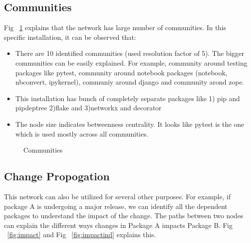 \subsection{Communities} \label{comm}
Fig ~\ref{fig:community} explains that the network has large number of
communities. In this specific installation, it can be observed that:
 \begin{itemize}
\item There are 10 identified communities (used resolution factor of 5). The
bigger communities can be easily explained. For example, community around
testing packages like pytest, community around notebook packages (notebook,
nbconvert, ipykernel), communiy around django and community arond zope.
\item This installation has bunch of completely separate packages like 1) pip
and pipdeptree 2)flake and 3)networkx and decorator
\item The node size indicates betweenness centrality. It looks like pytest is
the one which is used mostly across all communities.
\end{itemize}
\begin{figure}[community]
\centering
{}
\caption{Communities}
\label{fig:community}
\end{figure}


\subsection{Change Propogation} \label{change}
This network can also be utilized for several other purposes. For example, if
 package A is undergoing a major release, we can identify all the dependent
 packages to understand the impact of the change. The paths between two nodes
  can explain the different ways changes in Package A impacts Package B.
  Fig ~\ref{fig:impact} and Fig ~\ref{fig:impactind}  explains this.

